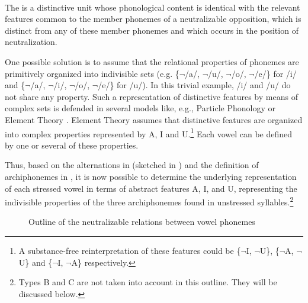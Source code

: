 \documentclass[output=paper,modfonts,newtxmath,hidelinks,]{langscibook}
\begin{document}
 \citep[201]{Akamatsu1988}\label{5:18}\\
The  is a distinctive unit whose phonological content is identical with the relevant features common to the member phonemes of a neutralizable opposition, which is distinct from any of these member phonemes and which occurs in the position of neutralization.
\z

\noindent One possible solution is to assume that the relational properties of phonemes are primitively organized into indivisible sets (e.g. \{$\neg$/a/, $\neg$/u/, $\neg$/o/, $\neg$/e/\} for /i/ and \{$\neg$/a/, $\neg$/i/, $\neg$/o/, $\neg$/e/\} for /u/). In this trivial example, /i/ and /u/ do not share any property. Such a representation of distinctive features by means of complex sets is defended in several models like, e.g., Particle Phonology \citep{Schane1984} or Element Theory \citep{Kaye-etal1985}. Element Theory assumes that distinctive features are organized into complex properties represented by {\textbar}A{\textbar}, {\textbar}I{\textbar} and {\textbar}U{\textbar}.\footnote{A substance-free reinterpretation of these features could be \{$\neg${\textbar}I{\textbar}, $\neg${\textbar}U{\textbar}\}, \{$\neg${\textbar}A{\textbar}, $\neg${\textbar}U{\textbar}\} and \{$\neg${\textbar}I{\textbar}, $\neg${\textbar}A{\textbar}\} respectively.} Each vowel can be defined by one or several of these properties.

Thus, based on the alternations in  (sketched in ) and the definition of archiphonemes in , it is now possible to determine the underlying representation of each stressed vowel in terms of abstract features {\textbar}A{\textbar}, {\textbar}I{\textbar}, and {\textbar}U{\textbar}, representing the indivisible properties of the three archiphonemes found in unstressed syllables.\footnote{Types B and C are not taken into account in this outline. They will be discussed below.}


\begin{figure}
\caption{Outline of the neutralizable relations between vowel phonemes}
\label{5:f3}
\end{figure}
\end{document}
